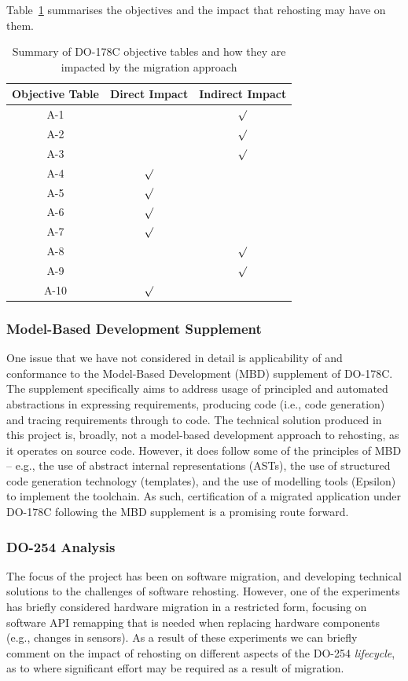 \documentclass{llncs}
\begin{document}
Table~\ref{table:summary} summarises the objectives and the impact that rehosting may have on them.

\begin{table}[htbp]
\begin{center}
\begin{tabular}{|c|c|c|}\hline\hline
\textbf{Objective Table} & \textbf{Direct Impact} & \textbf{Indirect Impact} \\ \hline
A-1 & & $\surd$ \\ \hline
A-2 & & $\surd$ \\ \hline
A-3 & & $\surd$ \\ \hline
A-4 & $\surd$ & \\ \hline
A-5 & $\surd$ & \\ \hline
A-6 & $\surd$ & \\ \hline
A-7 & $\surd$ & \\ \hline
A-8 & & $\surd$ \\ \hline
A-9 & & $\surd$ \\ \hline
A-10 & $\surd$ & \\ \hline\hline
\end{tabular}
\end{center}
\caption{Summary of DO-178C objective tables and how they are impacted by the migration approach}
\label{table:summary}
\end{table}

\subsubsection{Model-Based Development Supplement}
One issue that we have not considered in detail is applicability of and conformance to the Model-Based Development (MBD) supplement of DO-178C. The supplement specifically aims to address usage of principled and automated abstractions in expressing requirements, producing code (i.e., code generation) and tracing requirements through to code. The technical solution produced in this project is, broadly, not a model-based development approach to rehosting, as it operates on source code. However, it does follow some of the principles of MBD -- e.g., the use of abstract internal representations (ASTs), the use of structured code generation technology (templates), and the use of modelling tools (Epsilon) to implement the toolchain. As such, certification of a migrated application under DO-178C following the MBD supplement is a promising route forward.

\subsubsection{DO-254 Analysis}
The focus of the project has been on software migration, and developing technical solutions to the challenges of software rehosting. However, one of the experiments has briefly considered hardware migration in a restricted form, focusing on software API remapping that is needed when replacing hardware components (e.g., changes in sensors). As a result of these experiments we can briefly comment on the impact of rehosting on different aspects of the DO-254 \textit{lifecycle}, as to where significant effort may be required as a result of migration.
\end{document}
